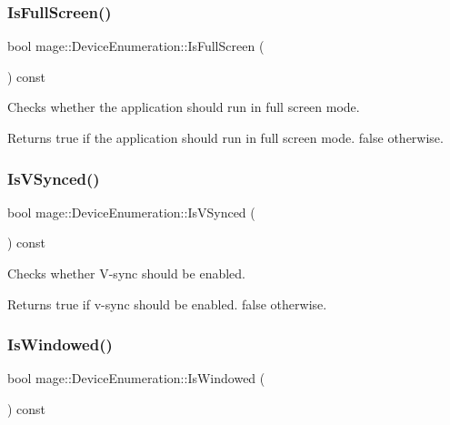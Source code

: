 \subsubsection{\texorpdfstring{Is\+Full\+Screen()}{IsFullScreen()}}
{\footnotesize\ttfamily bool mage\+::\+Device\+Enumeration\+::\+Is\+Full\+Screen (\begin{DoxyParamCaption}{ }\end{DoxyParamCaption}) const\hspace{0.3cm}{\ttfamily [noexcept]}}

Checks whether the application should run in full screen mode.

\begin{DoxyReturn}{Returns}
{\ttfamily true} if the application should run in full screen mode. {\ttfamily false} otherwise. 
\end{DoxyReturn}
\hypertarget{classmage_1_1_device_enumeration_a0eb995592a2bb3fbf33c2fff10123b03}{}\label{classmage_1_1_device_enumeration_a0eb995592a2bb3fbf33c2fff10123b03} 
\subsubsection{\texorpdfstring{Is\+V\+Synced()}{IsVSynced()}}
{\footnotesize\ttfamily bool mage\+::\+Device\+Enumeration\+::\+Is\+V\+Synced (\begin{DoxyParamCaption}{ }\end{DoxyParamCaption}) const\hspace{0.3cm}{\ttfamily [noexcept]}}

Checks whether V-\/sync should be enabled.

\begin{DoxyReturn}{Returns}
{\ttfamily true} if v-\/sync should be enabled. {\ttfamily false} otherwise. 
\end{DoxyReturn}
\hypertarget{classmage_1_1_device_enumeration_a7a7d0c5a27309421209b5d89cd9dfd43}{}\label{classmage_1_1_device_enumeration_a7a7d0c5a27309421209b5d89cd9dfd43} 
\subsubsection{\texorpdfstring{Is\+Windowed()}{IsWindowed()}}
{\footnotesize\ttfamily bool mage\+::\+Device\+Enumeration\+::\+Is\+Windowed (\begin{DoxyParamCaption}{ }\end{DoxyParamCaption}) const\hspace{0.3cm}{\ttfamily [noexcept]}}

